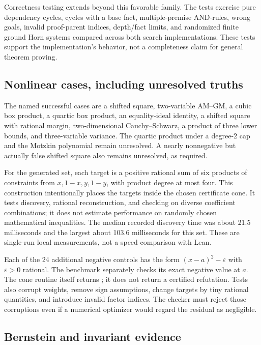 Correctness testing extends beyond this favorable family. The tests exercise
pure dependency cycles, cycles with a base fact, multiple-premise AND-rules,
wrong goals, invalid proof-parent indices, depth/fact limits, and randomized
finite ground Horn systems compared across both search implementations.
These tests support the implementation's behavior, not a completeness claim
for general theorem proving.

\subsection{Nonlinear cases, including unresolved truths}

The named successful cases are a shifted square, two-variable AM--GM, a cubic
box product, a quartic box product, an equality-ideal identity, a shifted square
with rational margin, two-dimensional Cauchy--Schwarz, a product of three lower
bounds, and three-variable variance. The quartic product under a degree-2 cap
and the Motzkin polynomial remain unresolved. A nearly nonnegative but actually
false shifted square also remains unresolved, as required.

For the generated set, each target is a positive rational sum of six products
of constraints from $x,1-x,y,1-y$, with product degree at most four. This
construction intentionally places the targets inside the chosen certificate
cone. It tests discovery, rational reconstruction, and checking on diverse
coefficient combinations; it does not estimate performance on randomly chosen
mathematical inequalities. The median recorded discovery time was about
21.5 milliseconds and the largest about 103.6 milliseconds for this set.
These are single-run local measurements, not a speed comparison with Lean.

Each of the 24 additional negative controls has the form
$(x-a)^2-\varepsilon$ with $\varepsilon>0$ rational. The benchmark separately
checks its exact negative value at $a$. The cone routine itself returns
; it does not return a certified refutation. Tests also corrupt
weights, remove sign assumptions, change targets by tiny rational quantities,
and introduce invalid factor indices. The checker must reject those corruptions
even if a numerical optimizer would regard the residual as negligible.

\subsection{Bernstein and invariant evidence}


